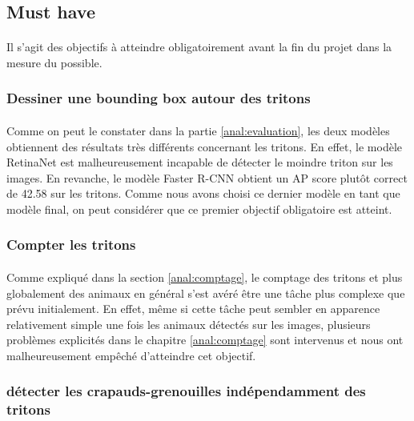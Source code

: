 \subsection{Must have}
\paragraph{} Il s'agit des objectifs à atteindre obligatoirement avant la fin du projet dans la mesure du possible.

\subsubsection{Dessiner une bounding box autour des tritons}
\paragraph{} Comme on peut le constater dans la partie \ref{anal:evaluation}, les deux modèles obtiennent des résultats très différents concernant les tritons. En effet, le modèle RetinaNet est malheureusement incapable de détecter le moindre triton sur les images. En revanche, le modèle Faster R-CNN obtient un AP score plutôt correct de 42.58 sur les tritons. Comme nous avons choisi ce dernier modèle en tant que modèle final, on peut considérer que ce premier objectif obligatoire est atteint.

\subsubsection{Compter les tritons}\label{anal:tritons}
\paragraph{} Comme expliqué dans la section \ref{anal:comptage}, le comptage des tritons et plus globalement des animaux en général s'est avéré être une tâche plus complexe que prévu initialement. En effet, même si cette tâche peut sembler en apparence relativement simple une fois les animaux détectés sur les images, plusieurs problèmes explicités dans le chapitre \ref{anal:comptage} sont intervenus et nous ont malheureusement empêché d'atteindre cet objectif.

\subsubsection{détecter les crapauds-grenouilles indépendamment des tritons}
